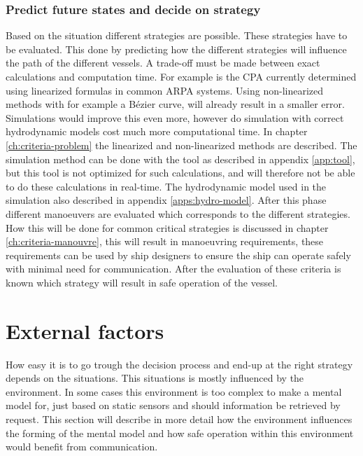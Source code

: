 \subsubsection{Predict future states and decide on strategy}
Based on the situation different strategies are possible. These strategies have to be evaluated. This done by predicting how the different strategies will influence the path of the different vessels. A trade-off must be made between exact calculations and computation time. For example is the \acf{CPA} currently determined using linearized formulas in common \ac{ARPA} systems. Using non-linearized methods with for example a Bézier curve, will already result in a smaller error. Simulations would improve this even more, however do simulation with correct hydrodynamic models cost much more computational time. In chapter \ref{ch:criteria-problem} the linearized and non-linearized methods are described. The simulation method can be done with the tool as described in appendix \ref{app:tool}, but this tool is not optimized for such calculations, and will therefore not be able to do these calculations in real-time. The hydrodynamic model used in the simulation also described in appendix \ref{apps:hydro-model}. After this phase different manoeuvers are evaluated which corresponds to the different strategies. How this will be done for common critical strategies is discussed in chapter \ref{ch:criteria-manouvre}, this will result in manoeuvring requirements, these requirements can be used by ship designers to ensure the ship can operate safely with minimal need for communication.
After the evaluation of these criteria is known which strategy will result in safe operation of the vessel.

\section{External factors}
How easy it is to go trough the decision process and end-up at the right strategy depends on the situations. This situations is mostly influenced by the environment. In some cases this environment is too complex to make a mental model for, just based on static sensors and should information be retrieved by request. This section will describe in more detail how the environment influences the forming of the mental model and how safe operation within this environment would benefit from communication. 

